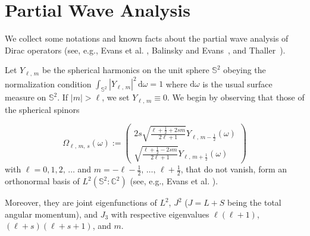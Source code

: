 \documentclass[10pt]{amsart}
\theoremstyle{definition}
\newcommand*\rd{\mathrm{d}}
\newcommand{\bbS}{\mathbb{S}}
\newcommand*\cz{\mathbb{C}}
\newcommand*\domega{\rd\omega}
\begin{document}
\appendix

\section{Partial Wave Analysis}
\label{Anhang1}
\label{a:partialwaves}
We collect some notations and known facts about the partial wave analysis of Dirac operators (see, e.g., Evans et al. \cite{Evansetal1996}, Balinsky and Evans~\cite[Section~2.1]{BalinskyEvans2011}, and Thaller~\cite[Sections~4.6.3-4.6.5]{Thaller1992}).

Let $Y_{\ell,\,m}$ be the spherical harmonics on the unit sphere $\bbS^2$ obeying the normalization condition $\int_{\bbS^2}|Y_{\ell,\,m}|^2\,\domega=1$ where $\domega$ is the usual surface measure on $\bbS^2$. If $|m|>\ell$, we set $Y_{\ell,\,m}\equiv0$. We begin by observing that those of the spherical spinors

\begin{equation}\label{2.6}
\Omega_{\ell,\,m,\,s}(\omega) :=
\begin{pmatrix} 2s\sqrt{\frac{\ell+\frac12+2sm}{2\ell+1}}
Y_{\ell,\,m-\frac12}(\omega)\\ \sqrt{\frac{\ell+\frac12-2sm}{2\ell+1}} Y_{\ell,\,m+\frac12}(\omega)
\end{pmatrix}
\end{equation}
with $\ell=0,1,2,\,\dots$ and $m=-\ell-\frac12,\,\dots,\,\ell+\frac12$, that do not vanish, form an orthonormal basis of $L^2(\bbS^2:\cz^2)$ (see, e.g., Evans et al. \cite[Equation~(7)]{Evansetal1996}).

Moreover, they are joint eigenfunctions of $L^2$, $J^2$ ($J=L+S$ being the total angular momentum), and $J_3$ with respective eigenvalues $\ell(\ell+1)$, $(\ell+s)(\ell+s+1)$, and $m$.
\end{document}
